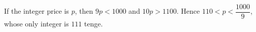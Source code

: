 If the integer price is $p$, then $9p<1000$ and $10p>1100$. Hence $110<p<\dfrac{1000}{9}$, whose only integer is $\boxed{111}$ tenge.
